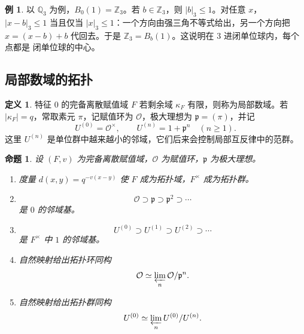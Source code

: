 \documentclass[11pt,a4paper,openany]{ctexbook}
\numberwithin{equation}{chapter}
\newcommand{\Q}{\mathbb{Q}}
\newcommand{\Z}{\mathbb{Z}}
\theoremstyle{plain}
\newtheorem{proposition}[theorem]{命题}
\theoremstyle{definition}
\newtheorem{definition}[theorem]{定义}
\newtheorem{example}[theorem]{例}
\theoremstyle{remark}
\begin{document}
\begin{example}
以 $\Q_3$ 为例，$B_0(1)=\Z_3$。若 $b\in\Z_3$，则 $|b|_3\le1$。对任意 $x$，
$|x-b|_3\le1$ 当且仅当 $|x|_3\le1$：一个方向由强三角不等式给出，另一个方向把
$x=(x-b)+b$ 代回去。于是 $\Z_3=B_b(1)$。这说明在 $3$ 进闭单位球内，每个点都是
闭单位球的中心。
\end{example}

\subsection{局部数域的拓扑}

\begin{definition}
特征 $0$ 的完备离散赋值域 $F$ 若剩余域 $\kappa_F$ 有限，则称为局部数域。若
$|\kappa_F|=q$，常取素元 $\pi$，记赋值环为 $\mathcal O$，极大理想为
$\mathfrak p=(\pi)$，并记
\[
U^{(0)}=\mathcal O^\times,\qquad U^{(n)}=1+\mathfrak p^n\quad(n\ge1).
\]
这里 $U^{(n)}$ 是单位群中越来越小的邻域，它们后来会控制局部互反律中的范群。
\end{definition}

\begin{proposition}
设 $(F,v)$ 为完备离散赋值域，$\mathcal O$ 为赋值环，$\mathfrak p$ 为极大理想。
\begin{enumerate}[label=(\arabic*)]
\item 度量 $d(x,y)=q^{-v(x-y)}$ 使 $F$ 成为拓扑域，$F^\times$ 成为拓扑群。
\item
\[
\mathcal O\supset\mathfrak p\supset\mathfrak p^2\supset\cdots
\]
是 $0$ 的邻域基。
\item
\[
U^{(0)}\supset U^{(1)}\supset U^{(2)}\supset\cdots
\]
是 $F^\times$ 中 $1$ 的邻域基。
\item 自然映射给出拓扑环同构
\[
\mathcal O\simeq\varprojlim_n\mathcal O/\mathfrak p^n.
\]
\item 自然映射给出拓扑群同构
\[
U^{(0)}\simeq\varprojlim_n U^{(0)}/U^{(n)}.
\]
\end{enumerate}
\end{proposition}
\end{document}
